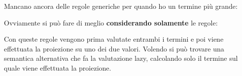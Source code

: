 \begin{prooftree}
\end{prooftree}

\begin{prooftree}
\end{prooftree}

\begin{prooftree}
\end{prooftree}

\noindent Mancano ancora delle regole generiche per quando ho un termine più grande:

\begin{prooftree}
\end{prooftree}

\begin{prooftree}
\end{prooftree}

\noindent Ovviamente si può fare di meglio \textbf{considerando solamente} le regole:

\begin{prooftree}
\end{prooftree}

\begin{prooftree}
\end{prooftree}

\begin{prooftree}
\end{prooftree}

\begin{prooftree}
\end{prooftree}

Con queste regole vengono prima valutate entrambi i termini e poi viene effettuata la proiezione su uno dei due valori. Volendo si può trovare una semantica alternativa che fa la valutazione lazy, calcolando solo il termine sul quale viene effettuata la proiezione.

